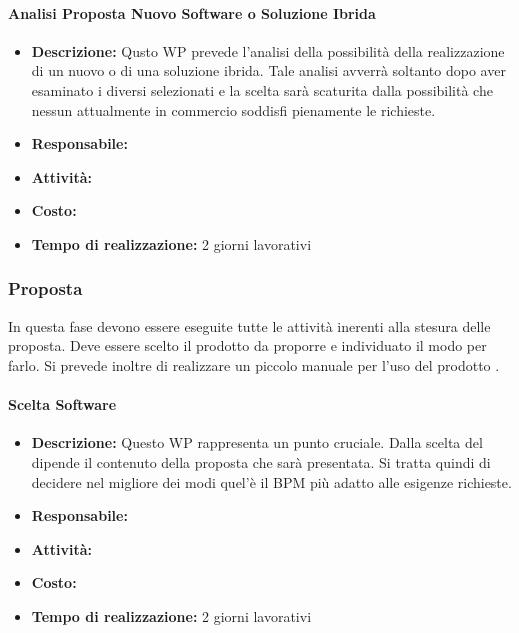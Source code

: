 \paragraph{Analisi Proposta Nuovo Software o Soluzione Ibrida }
\begin{itemize}
\item{\bfseries Descrizione:} Qusto WP prevede l'analisi della possibilità della realizzazione di un nuovo  o di una soluzione ibrida. Tale analisi avverrà soltanto dopo aver esaminato i diversi  selezionati e la scelta sarà scaturita dalla possibilità che nessun  attualmente in commercio soddisfi pienamente le richieste.
\item {\bfseries Responsabile:}
\item  {\bfseries Attività:}
\item  {\bfseries Costo:}
\item  {\bfseries Tempo di realizzazione:} 2 giorni lavorativi
\end{itemize}




\subsubsection{Proposta}
In questa fase devono essere eseguite tutte le attività inerenti alla stesura delle proposta. Deve essere scelto il prodotto da proporre e individuato il modo per farlo. Si prevede inoltre di realizzare un piccolo manuale per l'uso del prodotto .

\paragraph{Scelta Software }
\begin{itemize}
\item{\bfseries Descrizione:} Questo WP rappresenta un punto cruciale. Dalla scelta del  dipende il contenuto della proposta che sarà presentata. Si tratta quindi di decidere  nel migliore dei modi quel'è il  BPM più adatto alle esigenze richieste.
\item {\bfseries Responsabile:}
\item  {\bfseries Attività:}
\item  {\bfseries Costo:}
\item  {\bfseries Tempo di realizzazione:} 2 giorni lavorativi
\end{itemize}

